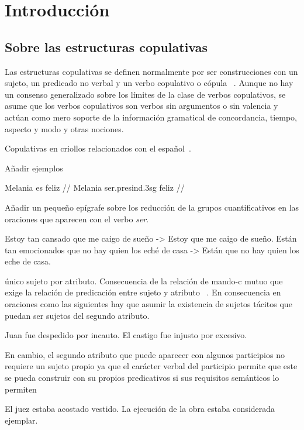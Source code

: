 \chapter{Introducción}
\vspace*{-.25in}
\section{Sobre las estructuras copulativas}
Las estructuras copulativas se definen normalmente por ser construcciones con un sujeto, un predicado no verbal y un verbo copulativo o cópula ~\autocite{Bentley20179Copular-and-}. Aunque no hay un consenso generalizado sobre los límites de la clase de verbos copulativos, se asume que los verbos copulativos son verbos sin argumentos o sin valencia y actúan como mero soporte de la información gramatical de concordancia, tiempo, aspecto y modo y otras nociones.


Copulativas en criollos relacionados con el español~\autocite{Green1997Romance-creoles}. 

Añadir ejemplos



\ex[glspace=!1em,everygla={},everyglb={},aboveglbskip=-.2ex]
\begingl
\gla Melania es feliz //
\glb Melania ser.{\sc presind}.{\sc 3sg} feliz  //
\endgl
\xe


Añadir un pequeño epígrafe sobre los reducción de la grupos cuantificativos en las oraciones que aparecen con el verbo \textit{ser}.

\pex[*]
\a	Estoy tan cansado que me caigo de sueño -> Estoy que me caigo de sueño.
\a	Están tan emocionados que no hay quien los eché de casa -> Están que no hay quien los eche de casa.
\xe


único sujeto por atributo. Consecuencia de la relación de mando-c mutuo que exige la relación de predicación entre sujeto y atributo ~\autocite{Williams1980Predication,Bowers1993The-Syntax-of-Predic}. En consecuencia en oraciones como las siguientes hay que asumir la existencia de sujetos tácitos que puedan ser sujetos del segundo atributo.

\pex[*]
\a Juan fue despedido por incauto.
\a El castigo fue injusto por excesivo.
\xe


En cambio, el segundo atributo que puede aparecer con algunos participios no requiere un sujeto propio ya que el carácter verbal del participio permite que este se pueda construir con su propios predicativos si sus requisitos semánticos lo permiten~\autocite{Bosque1999el-sintagma-adjetiva}

\pex[*]
\a	El juez estaba acostado vestido.
\a	La ejecución de la obra estaba considerada ejemplar.
\xe

